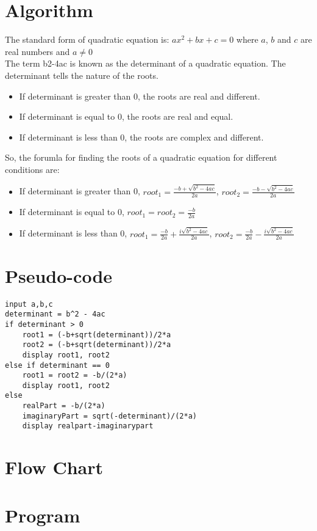 \documentclass[11pt]{report}
\begin{document}
\section{Algorithm}
The standard form of quadratic equation is: $ax^2+bx+c=0$ where $a$, $b$ and $c$ are real numbers and $a \neq 0$ \\
The term b2-4ac is known as the determinant of a quadratic equation. The determinant tells the nature of the roots.
\begin{itemize}
\item If determinant is greater than 0, the roots are real and different.
\item If determinant is equal to 0, the roots are real and equal.
\item If determinant is less than 0, the roots are complex and different.
\end{itemize}
So, the forumla for finding the roots of a quadratic equation for different conditions are:
\begin{itemize}
\item If determinant is greater than 0, $root_1 = \frac{-b+\sqrt{b^2-4ac}}{2a}$, $root_2 = \frac{-b-\sqrt{b^2-4ac}}{2a}$
\item If determinant is equal to 0, $root_1=root_2=\frac{-b}{2a}$
\item If determinant is less than 0, $root_1 = \frac{-b}{2a}+\frac{i\sqrt{b^2-4ac}}{2a}$, $root_2 = \frac{-b}{2a}-\frac{i\sqrt{b^2-4ac}}{2a}$
\end{itemize}
\section{Pseudo-code}
\begin{lstlisting}
input a,b,c
determinant = b^2 - 4ac
if determinant > 0
    root1 = (-b+sqrt(determinant))/2*a
    root2 = (-b+sqrt(determinant))/2*a
    display root1, root2
else if determinant == 0
    root1 = root2 = -b/(2*a)
    display root1, root2
else
    realPart = -b/(2*a)
    imaginaryPart = sqrt(-determinant)/(2*a)
    display realpart-imaginarypart
\end{lstlisting}
\section{Flow Chart}
\leavevmode\newpage
\section{Program}

\end{document}
